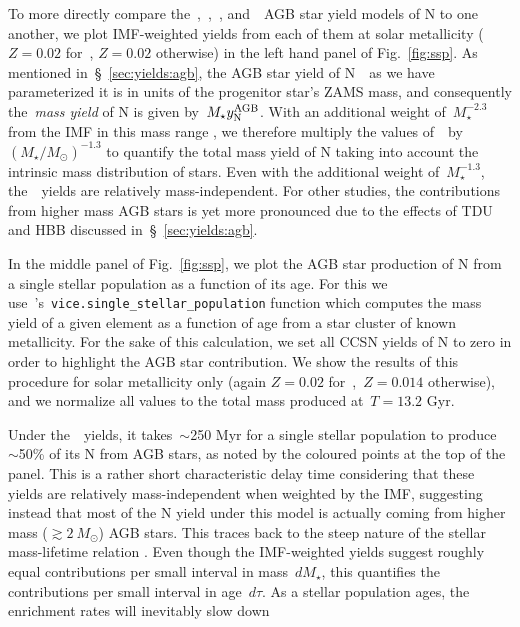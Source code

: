 \documentclass[ms.tex]{subfiles}
\begin{document}
To more directly compare the~\karakasten,~\karakas,~\ventura,
and~\cristallo~AGB star yield models of N to one another, we plot IMF-weighted
yields from each of them at solar metallicity ($Z = 0.02$ for~\karakasten,
$Z = 0.02$ otherwise) in the left hand panel of Fig.~\ref{fig:ssp}.
As mentioned in~\S~\ref{sec:yields:agb}, the AGB star yield of N~~as we
have parameterized it is in units of the progenitor star's ZAMS mass, and
consequently the~\textit{mass yield} of N is given by~$M_\star y_\text{N}^\text{AGB}$.
With an additional weight of~$M_\star^{-2.3}$ from the IMF in this mass range
\citep[e.g.][]{Kroupa2001}, we therefore multiply the values of~~by
$(M_\star / M_\odot)^{-1.3}$ to quantify the total mass yield of N taking into
account the intrinsic mass distribution of stars.
Even with the additional weight of~$M_\star^{-1.3}$, the~\cristallo~yields are
relatively mass-independent.
For other studies, the contributions from higher mass AGB stars is yet more
pronounced due to the effects of TDU and HBB discussed
in~\S~\ref{sec:yields:agb}.
\par
In the middle panel of Fig.~\ref{fig:ssp}, we plot the AGB star production of
N from a single stellar population as a function of its age.
For this we use~\vice's~\texttt{vice.single\_stellar\_population} function
which computes the mass yield of a given element as a function of age from a
star cluster of known metallicity.
For the sake of this calculation, we set all CCSN yields of N to zero in order
to highlight the AGB star contribution.
We show the results of this procedure for solar metallicity only (again
$Z = 0.02$ for~\karakasten,~$Z = 0.014$ otherwise), and we normalize all values
to the total mass produced at~$T = 13.2$ Gyr.
\par
Under the~\cristallo~yields, it takes~$\sim$250 Myr for a single stellar
population to produce~$\sim$50\% of its N from AGB stars, as noted by the
coloured points at the top of the panel.
This is a rather short characteristic delay time considering that these yields
are relatively mass-independent when weighted by the IMF, suggesting
instead that most of the N yield under this model is actually coming from
higher mass ($\gtrsim 2~M_\odot$) AGB stars.
This traces back to the steep nature of the stellar mass-lifetime relation
\citep[e.g.][]{Larson1974, Maeder1989, Padovani1993}.
Even though the IMF-weighted yields suggest roughly equal contributions per
small interval in mass~$dM_\star$, this quantifies the contributions per small
interval in age~$d\tau$.
As a stellar population ages, the enrichment rates will inevitably slow down
\end{document}
